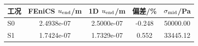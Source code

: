 \begin{tabular}{@{}lS[table-format=1.4e-2]S[table-format=1.4e-2]S[table-format=+1.3]S[table-format=5.2]@{}}
\toprule
工况 & {FEniCS $u_{\rm end}$/m} & {1D $u_{\rm end}$/m} & {偏差/\%} & {$\sigma_{\rm mid}$/Pa} \\
\midrule
S0 & 2.4938e-07 & 2.5000e-07 & -0.248 & 50000.00 \\
S1 & 1.7424e-07 & 1.7329e-07 & 0.552 & 33445.12 \\
\bottomrule
\end{tabular}
